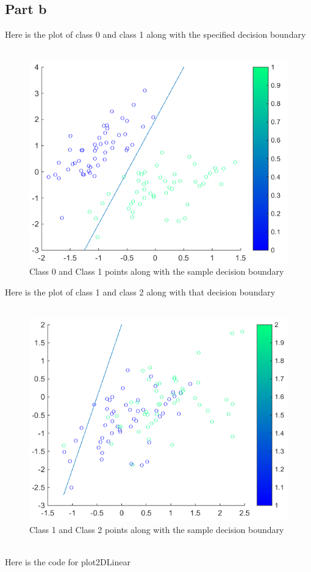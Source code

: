 \documentclass[twoside,11pt]{article}
\theoremstyle{definition}
\begin{document}
\subsection*{Part b}

Here is the plot of class 0 and class 1 along with the specified decision boundary\\
\\
\begin{figure}[h]
\centering
\includegraphics[width=4 in]{prob1bPlot1.png}
\caption{Class 0 and Class 1 points along with the sample decision boundary}
\end{figure}
\newpage
Here is the plot of class 1 and class 2 along with that decision boundary\\
\\
\begin{figure}[h]
\centering
\includegraphics[width=4 in]{prob1bPlot2.png}
\caption{Class 1 and Class 2 points along with the sample decision boundary}
\end{figure}
\\
Here is the code for plot2DLinear


\newpage
\end{document}
